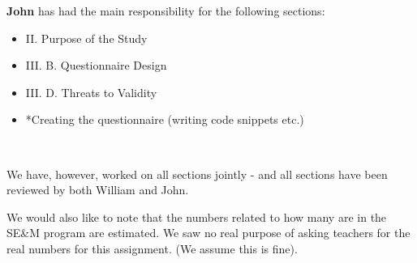 \documentclass[times, 10pt,twocolumn]{Article}
\begin{document}
\textbf{John} has had the main responsibility for the following sections:
\begin{itemize} \renewcommand{\labelitemi}{$\bullet$} 
\item II. Purpose of the Study
\item III. B. Questionnaire Design
\item III. D. Threats to Validity
\item *Creating the questionnaire (writing code snippets etc.)
\end{itemize}
\

We have, however, worked on all sections jointly - and all sections have been reviewed by both William and John. 

We would also like to note that the numbers related to how many are in the SE\&M program are estimated. We saw no real purpose of asking teachers for the real numbers for this assignment. (We assume this is fine). 
\end{document}
